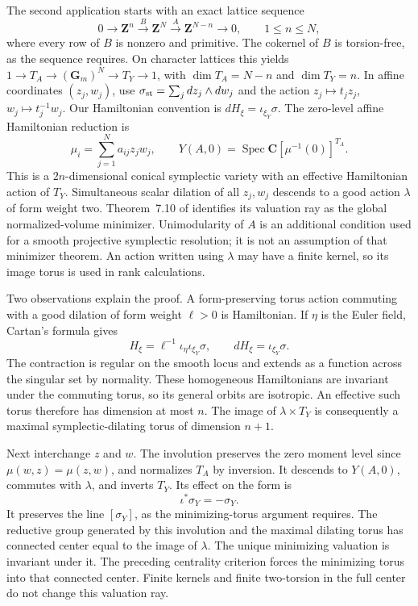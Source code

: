 The second application starts with an exact lattice sequence
\[
\tag{68.23bv}\label{eq:ytd-hypertoric-lattice}
 0\longrightarrow\mathbf Z^n\xrightarrow{B}\mathbf Z^N
 \xrightarrow{A}\mathbf Z^{N-n}\longrightarrow0,
 \qquad 1\leq n\leq N,
\]
where every row of $B$ is nonzero and primitive. The cokernel of
$B$ is torsion-free, as the sequence requires. On character lattices
this yields $1\to T_A\to(\mathbf G_m)^N\to T_Y\to1$, with
$\dim T_A=N-n$ and $\dim T_Y=n$. In affine coordinates $(z_j,w_j)$,
use $\sigma_{\rm st}=\sum_j dz_j\wedge dw_j$ and the action
$z_j\mapsto t_jz_j$, $w_j\mapsto t_j^{-1}w_j$.
Our Hamiltonian convention is $dH_\xi=\iota_{\xi_Y}\sigma$.
The zero-level affine Hamiltonian reduction is
\[
\tag{68.23bw}\label{eq:ytd-hypertoric-reduction}
 \mu_i=\sum_{j=1}^N a_{ij}z_jw_j,
 \qquad Y(A,0)=\operatorname{Spec}
                   \mathbf C[\mu^{-1}(0)]^{T_A}.
\]
This is a $2n$-dimensional conical symplectic variety with an
effective Hamiltonian action of $T_Y$. Simultaneous scalar dilation
of all $z_j,w_j$ descends to a good action $\lambda$ of form weight
two. Theorem~7.10 of \cite{XuZhuang26StableFormsV2} identifies its
valuation ray as the global normalized-volume minimizer.
Unimodularity of $A$ is an additional condition used for a smooth
projective symplectic resolution; it is not an assumption of that
minimizer theorem. An action written using $\lambda$ may have a
finite kernel, so its image torus is used in rank calculations.

Two observations explain the proof. A form-preserving torus action
commuting with a good dilation of form weight $\ell>0$ is Hamiltonian.
If $\eta$ is the Euler field, Cartan's formula gives
\[
\tag{68.23bx}\label{eq:ytd-conical-hamiltonian}
 H_\xi=\ell^{-1}\iota_\eta\iota_{\xi_Y}\sigma,
 \qquad dH_\xi=\iota_{\xi_Y}\sigma.
\]
The contraction is regular on the smooth locus and extends as a
function across the singular set by normality. These homogeneous
Hamiltonians are invariant under the commuting torus, so its
general orbits are isotropic. An effective such torus therefore
has dimension at most $n$. The image of $\lambda\times T_Y$ is
consequently a maximal symplectic-dilating torus of dimension $n+1$.

Next interchange $z$ and $w$. The involution preserves the zero
moment level since $\mu(w,z)=\mu(z,w)$, and normalizes $T_A$ by
inversion. It descends to $Y(A,0)$, commutes with $\lambda$, and
inverts $T_Y$. Its effect on the form is
\[
\tag{68.23by}\label{eq:ytd-hypertoric-swap}
 \iota^*\sigma_Y=-\sigma_Y.
\]
It preserves the line $[\sigma_Y]$, as the minimizing-torus argument
requires. The reductive group generated by this involution and
the maximal dilating torus has connected center equal to the image
of $\lambda$. The unique minimizing valuation is invariant under
it. The preceding centrality criterion forces the minimizing
torus into that connected center. Finite kernels and finite
two-torsion in the full center do not change this valuation ray.

